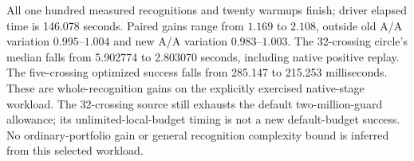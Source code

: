 All one hundred measured recognitions and twenty warmups finish; driver
elapsed time is 146.078 seconds. Paired gains range from $1.169$ to $2.108$,
outside old A/A variation $0.995$--$1.004$ and new A/A variation
$0.983$--$1.003$. The 32-crossing circle's median falls from 5.902774 to
2.803070 seconds, including native positive replay. The five-crossing
optimized success falls from 285.147 to 215.253 milliseconds. These are
whole-recognition gains on the explicitly exercised native-stage workload.
The 32-crossing source still exhausts the default two-million-guard allowance;
its unlimited-local-budget timing is not a new default-budget success.
No ordinary-portfolio gain or general recognition complexity bound is
inferred from this selected workload.
